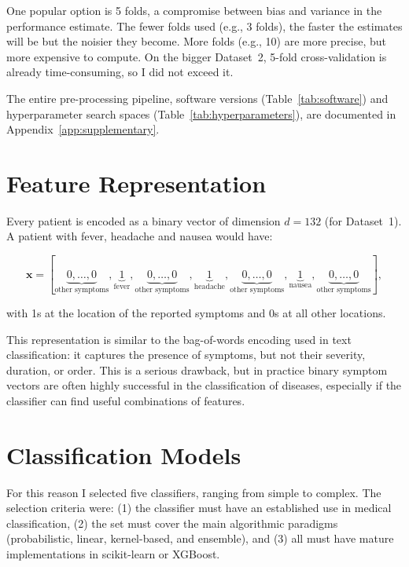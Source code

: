 One popular option is 5 folds, a compromise between bias and variance in the performance estimate. The fewer folds used (e.g., 3 folds), the faster the estimates will be but the noisier they become. More folds (e.g., 10) are more precise, but more expensive to compute. On the bigger Dataset~2, 5-fold cross-validation is already time-consuming, so I did not exceed it.

The entire pre-processing pipeline, software versions (Table~\ref{tab:software}) and hyperparameter search spaces (Table~\ref{tab:hyperparameters}), are documented in Appendix~\ref{app:supplementary}.

\section{Feature Representation}
\label{sec:feature_representation}

Every patient is encoded as a binary vector of dimension $d = 132$ (for Dataset~1). A patient with fever, headache and nausea would have:

\begin{equation}
\label{eq:feature_vector}
\mathbf{x} = [\underbrace{0, \ldots, 0}_{\text{other symptoms}}, \underbrace{1}_{\text{fever}}, \underbrace{0, \ldots, 0}_{\text{other symptoms}}, \underbrace{1}_{\text{headache}}, \underbrace{0, \ldots, 0}_{\text{other symptoms}}, \underbrace{1}_{\text{nausea}}, \underbrace{0, \ldots, 0}_{\text{other symptoms}}],
\end{equation}

\noindent with 1s at the location of the reported symptoms and 0s at all other locations.

This representation is similar to the bag-of-words encoding used in text classification: it captures the presence of symptoms, but not their severity, duration, or order. This is a serious drawback, but in practice binary symptom vectors are often highly successful in the classification of diseases, especially if the classifier can find useful combinations of features.

\section{Classification Models}
\label{sec:models}

For this reason I selected five classifiers, ranging from simple to complex. The selection criteria were: (1) the classifier must have an established use in medical classification, (2) the set must cover the main algorithmic paradigms (probabilistic, linear, kernel-based, and ensemble), and (3) all must have mature implementations in scikit-learn or XGBoost.

